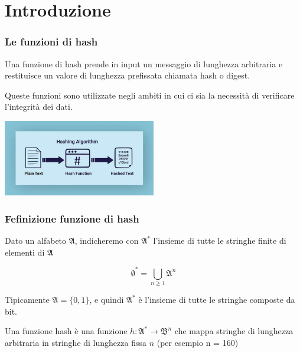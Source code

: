 
\section{Introduzione} %


\begin{frame}
\frametitle{Le funzioni di hash}

Una funzione di hash prende in input un messaggio di lunghezza arbitraria e restituisce un valore di lunghezza prefissata chiamata hash o digest.

Queste funzioni sono utilizzate negli ambiti in cui ci sia la necessità di verificare l'integrità dei dati.
\vspace{1cm}
\begin{center}
    \includegraphics[width=0.5\textwidth]{img/1-img/hash-function.jpeg}
\end{center}
    

\end{frame}

\begin{frame}
\frametitle{Fefinizione funzione di hash}

Dato un alfabeto $\mathfrak{A}$, indicheremo con $\mathfrak{A}^*$ l’insieme di tutte le stringhe finite di elementi di $\mathfrak{A}$

\[
\emptyset^* = \bigcup_{n \geq 1} \mathfrak{A}^n
\]

Tipicamente $\mathfrak{A} = \{0, 1\}$, e quindi $\mathfrak{A}^*$ è l’insieme di tutte le stringhe composte da bit.

\vspace{1cm}
Una funzione hash è una funzione $h : \mathfrak{A}^* \rightarrow \mathfrak{B}^n$ che mappa stringhe di lunghezza arbitraria in stringhe di lunghezza fissa $n$ (per esempio n = 160)

\end{frame}


